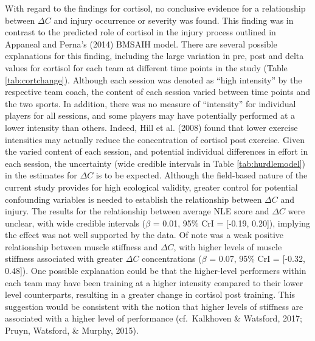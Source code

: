 \documentclass[man,floatsintext]{apa6}
\begin{document}
With regard to the findings for cortisol, no conclusive evidence for a relationship between \(\Delta C\) and injury occurrence or severity was found.
This finding was in contrast to the predicted role of cortisol in the injury process outlined in Appaneal and Perna's (2014) BMSAIH model.
There are several possible explanations for this finding, including the large variation in pre, post and delta values for cortisol for each team at different time points in the study (Table \ref{tab:cortchange}).
Although each session was denoted as \enquote{high intensity} by the respective team coach, the content of each session varied between time points and the two sports.
In addition, there was no measure of \enquote{intensity} for individual players for all sessions, and some players may have potentially performed at a lower intensity than others.
Indeed, Hill et al. (2008) found that lower exercise intensities may actually reduce the concentration of cortisol post exercise.
Given the varied content of each session, and potential individual differences in effort in each session, the uncertainty (wide credible intervals in Table \ref{tab:hurdlemodel}) in the estimates for \(\Delta C\) is to be expected.
Although the field-based nature of the current study provides for high ecological validity, greater control for potential confounding variables is needed to establish the relationship between \(\Delta C\) and injury.
The results for the relationship between average NLE score and \(\Delta C\) were unclear, with wide credible intervals (\(\beta\) = 0.01, 95\% CrI = {[}-0.19, 0.20{]}), implying the effect was not well supported by the data.
Of note was a weak positive relationship between muscle stiffness and \(\Delta C\), with higher levels of muscle stiffness associated with greater \(\Delta C\) concentrations (\(\beta\) = 0.07, 95\% CrI = {[}-0.32, 0.48{]}).
One possible explanation could be that the higher-level performers within each team may have been training at a higher intensity compared to their lower level counterparts, resulting in a greater change in cortisol post training.
This suggestion would be consistent with the notion that higher levels of stiffness are associated with a higher level of performance (cf.~Kalkhoven \& Watsford, 2017; Pruyn, Watsford, \& Murphy, 2015).
\end{document}
